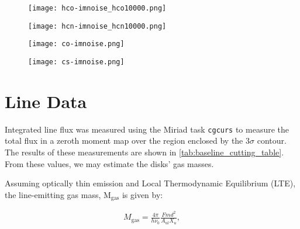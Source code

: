 \begin{figure}
  \centering
  \begin{minipage}{.48\textwidth}
    \centering
    \texttt{[image: hco-imnoise\_hco10000.png]}
    \label{fig:noise-profile_hco}
  \end{minipage}%
  \begin{minipage}{.48\textwidth}
    \centering
    \texttt{[image: hcn-imnoise\_hcn10000.png]}
    \label{fig:noise-profile_hcn}
  \end{minipage}%
  \par\medskip
  \begin{minipage}{.48\textwidth}
    \centering
    \texttt{[image: co-imnoise.png]}
    \label{fig:noise-profile_co}
  \end{minipage}%
  \begin{minipage}{.48\textwidth}
    \centering
    \texttt{[image: cs-imnoise.png]}
    \label{fig:noise-profile_cs}
  \end{minipage}

  \label{fig:noise-profiles}
\end{figure}





\section{Line Data}
\label{section:line_data}


Integrated line flux was measured using the Miriad task \texttt{cgcurs} to measure the total flux in a zeroth moment map over the region enclosed by the 3$\sigma$ contour. The results of these measurements are shown in \ref{tab:baseline_cutting_table}. From these values, we may estimate the disks' gas masses.

Assuming optically thin emission and Local Thermodynamic Equilibrium (LTE), the line-emitting gas mass, M$_{\text{gas}}$ is given by:

\begin{align}
  M_{\text{gas}}= \frac{4 \pi}{h \nu_0} \frac{F m d^2}{A_{ul} X_u},
  \label{M_gas}
\end{align}

